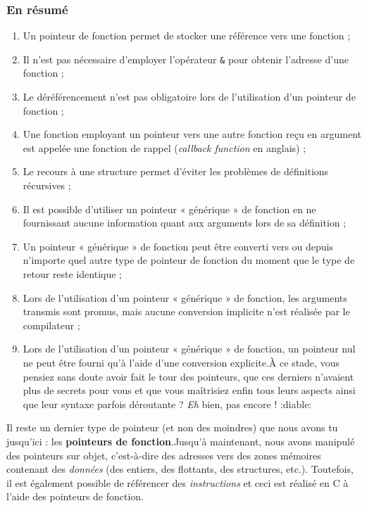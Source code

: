 \documentclass[]{article}
\date{}
\providecommand{\tightlist}{%
  \setlength{\itemsep}{0pt}\setlength{\parskip}{0pt}}
\begin{document}
{
\setcounter{tocdepth}{3}
\tableofcontents
}
\subsubsection{En résumé}\label{en-ruxe9sumuxe9}

\begin{enumerate}
\def\labelenumi{\arabic{enumi}.}
\tightlist
\item
  Un pointeur de fonction permet de stocker une référence vers une
  fonction ;
\item
  Il n'est pas nécessaire d'employer l'opérateur \texttt{\&} pour
  obtenir l'adresse d'une fonction ;
\item
  Le déréférencement n'est pas obligatoire lors de l'utilisation d'un
  pointeur de fonction ;
\item
  Une fonction employant un pointeur vers une autre fonction reçu en
  argument est appelée une fonction de rappel (\emph{callback function}
  en anglais) ;
\item
  Le recours à une structure permet d'éviter les problèmes de
  définitions récursives ;
\item
  Il est possible d'utiliser un pointeur « générique » de fonction en ne
  fournissant aucune information quant aux arguments lors de sa
  définition ;
\item
  Un pointeur « générique » de fonction peut être converti vers ou
  depuis n'importe quel autre type de pointeur de fonction du moment que
  le type de retour reste identique ;
\item
  Lors de l'utilisation d'un pointeur « générique » de fonction, les
  arguments transmis sont promus, mais aucune conversion implicite n'est
  réalisée par le compilateur ;
\item
  Lors de l'utilisation d'un pointeur « générique » de fonction, un
  pointeur nul ne peut être fourni qu'à l'aide d'une conversion
  explicite.À ce stade, vous pensiez sans doute avoir fait le tour des
  pointeurs, que ces derniers n'avaient plus de secrets pour vous et que
  vous maîtrisiez enfin tous leurs aspects ainsi que leur syntaxe
  parfois déroutante ? \emph{Eh} bien, pas encore ! :diable:
\end{enumerate}

Il reste un dernier type de pointeur (et non des moindres) que nous
avons tu jusqu'ici : les \textbf{pointeurs de fonction}.Jusqu'à
maintenant, nous avons manipulé des pointeurs sur objet, c'est-à-dire
des adresses vers des zones mémoires contenant des \emph{données} (des
entiers, des flottants, des structures, etc.). Toutefois, il est
également possible de référencer des \emph{instructions} et ceci est
réalisé en C à l'aide des pointeurs de fonction.
\end{document}
